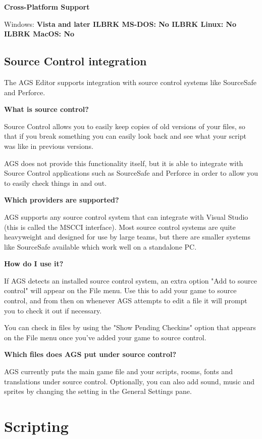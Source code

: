 \bf{Cross-Platform Support}

Windows: \bf{ Vista and later }ILBRK
MS-DOS: \bf{ No }ILBRK
Linux: \bf{ No }ILBRK
MacOS: \bf{ No }


\section{Source Control integration}\label{SourceControl}%

The AGS Editor supports integration with source control systems like SourceSafe and Perforce.

\bf{What is source control?}

Source Control allows you to easily keep copies of old versions of your files, so that
if you break something you can easily look back and see what your script was like
in previous versions.

AGS does not provide this functionality itself, but it is able to integrate with
Source Control applications such as SourceSafe and Perforce in order to allow you
to easily check things in and out.

\bf{Which providers are supported?}

AGS supports any source control system that can integrate with Visual Studio
(this is called the MSCCI interface). Most source control systems are quite
heavyweight and designed for use by large teams, but there are smaller
systems like SourceSafe available which work well on a standalone PC.

\bf{How do I use it?}

If AGS detects an installed source control system, an extra option "Add to
source control" will appear on the File menu. Use this to add your game to
source control, and from then on whenever AGS attempts to edit a file it
will prompt you to check it out if necessary.

You can check in files by using the "Show Pending Checkins" option that
appears on the File menu once you've added your game to source control.

\bf{Which files does AGS put under source control?}

AGS currently puts the main game file and your scripts, rooms, fonts and
translations under source control. Optionally, you can also add sound, music
and sprites by changing the setting in the General Settings pane.


\chapter{Scripting}%

